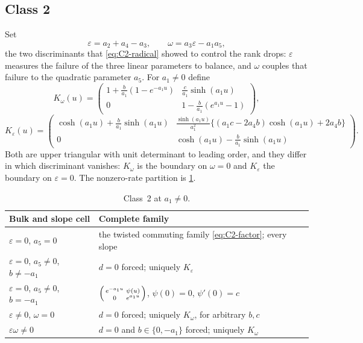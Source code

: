 \documentclass[11pt,reqno]{amsart}
\theoremstyle{plain}
\theoremstyle{definition}
\theoremstyle{remark}
\numberwithin{equation}{section}
\begin{document}
\subsection{Class 2}
\label{subsec:c2}

Set
\begin{equation}
\varepsilon=a_2+a_4-a_3,\qquad \omega=a_3\varepsilon-a_1a_5,
\label{eq:C2-vars}
\end{equation}
the two discriminants that \cref{eq:C2-radical} showed to control the rank drops:
$\varepsilon$ measures the failure of the three linear parameters to balance, and
$\omega$ couples that failure to the quadratic parameter $a_5$. For $a_1\ne0$
define
\begin{equation}
K_\omega(u)=\begin{pmatrix}
1+\frac b{a_1}(1-e^{-a_1u})&\frac c{a_1}\sinh(a_1u)\\
0&1-\frac b{a_1}(e^{a_1u}-1)
\end{pmatrix},                                      \label{eq:C2-omega}
\end{equation}
\begin{equation}
K_\varepsilon(u)=\begin{pmatrix}
\cosh(a_1u)+\frac b{a_1}\sinh(a_1u)&
\frac{\sinh(a_1u)}{a_1^2}\bigl\{(a_1c-2a_4b)\cosh(a_1u)+2a_4b\bigr\}\\
0&\cosh(a_1u)-\frac b{a_1}\sinh(a_1u)
\end{pmatrix}.                                      \label{eq:C2-delta}
\end{equation}
Both are upper triangular with unit determinant to leading order, and they differ
in which discriminant vanishes: $K_\omega$ is the boundary on $\omega=0$ and
$K_\varepsilon$ the boundary on $\varepsilon=0$. The nonzero-rate partition is
\cref{tab:C2-nonzero}.

\begin{table}[t]
\centering\small
\caption{Class~2 at $a_1\ne0$.}
\label{tab:C2-nonzero}
\begin{tabularx}{\textwidth}{>{\RaggedRight\arraybackslash}X >{\RaggedRight\arraybackslash}X}
\toprule
Bulk and slope cell & Complete family \\
\midrule
$\varepsilon=0$, $a_5=0$ & the twisted commuting family \cref{eq:C2-factor}; every slope \\
$\varepsilon=0$, $a_5\ne0$, $b\ne-a_1$ & $d=0$ forced; uniquely $K_\varepsilon$ \\
$\varepsilon=0$, $a_5\ne0$, $b=-a_1$ &
$\begin{psmallmatrix}e^{-a_1u}&\psi(u)\\0&e^{a_1u}\end{psmallmatrix}$,
$\psi(0)=0$, $\psi'(0)=c$ \\
$\varepsilon\ne0$, $\omega=0$ & $d=0$ forced; uniquely $K_\omega$, for arbitrary $b,c$ \\
$\varepsilon\omega\ne0$ & $d=0$ and $b\in\{0,-a_1\}$ forced; uniquely $K_\omega$ \\
\bottomrule
\end{tabularx}
\end{table}
\end{document}
